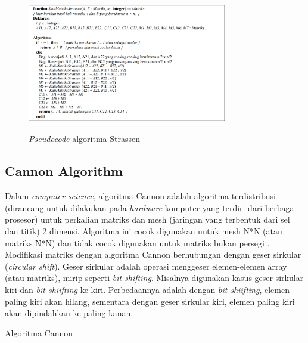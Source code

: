 \documentclass[conference]{IEEEtran}
\begin{document}
\begin{figure}[h]
    \includegraphics[width = 8.7cm, height = 6cm]{Pseudocode_Algoritma_Strassen.png}
    \centering
    \caption{\textit{Pseudocode} algoritma Strassen}
 \end{figure}

\subsection{Cannon Algorithm}
Dalam \textit{computer science}, algoritma Cannon adalah algoritma terdistribusi (dirancang untuk dilakukan pada \textit{hardware} komputer yang terdiri dari berbagai prosesor)
untuk perkalian matriks dan mesh (jaringan yang terbentuk dari sel dan titik) 2 dimensi.
Algoritma ini cocok digunakan untuk mesh N*N (atau matriks N*N) dan tidak cocok digunakan untuk matriks bukan persegi \cite{b1}.
Modifikasi matriks dengan algoritma Cannon berhubungan dengan geser sirkular (\textit{circular shift}).
Geser sirkular adalah operasi menggeser elemen-elemen array (atau matriks), mirip seperti \textit{bit shifting}.
Misalnya digunakan kasus geser sirkular kiri dan \textit{bit shiifting} ke kiri.
Perbedaannya adalah dengan \textit{bit shiifting}, elemen paling kiri akan hilang, 
sementara dengan geser sirkular kiri, elemen paling kiri akan dipindahkan ke paling kanan.

\begin{algorithm}
    \caption{Algoritma Cannon}
    \\
\end{algorithm}
\end{document}

